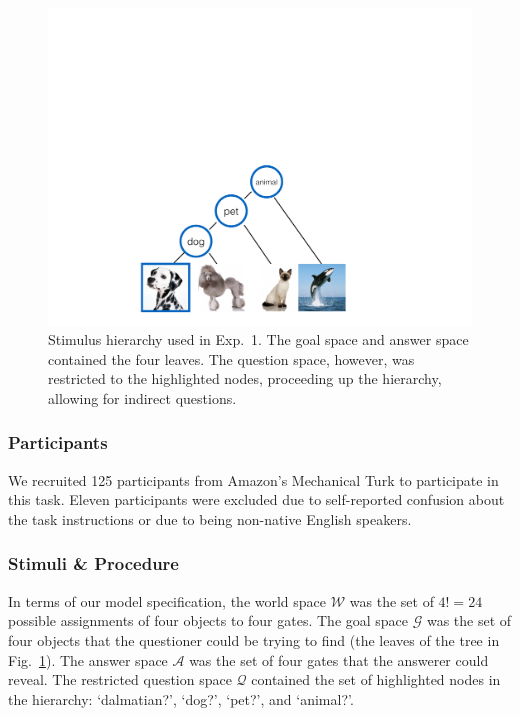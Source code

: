\documentclass[12pt, floatsintext, man]{apa6}
\begin{document}
\begin{figure}[t!]
\begin{center}
\includegraphics[scale = .35]{taskhierarchy.pdf}
\end{center}
\vspace{-.25cm}
\caption{Stimulus hierarchy used in Exp.~1. The goal space and answer space contained the four leaves. %
The question space, however, was restricted to the highlighted nodes, proceeding up the hierarchy, allowing for indirect questions.}
\label{fig:taskhierarchy}
\end{figure}

\subsubsection{Participants} We recruited 125 participants %
from Amazon's Mechanical Turk to participate in this task.  %
Eleven participants were excluded due to self-reported confusion about the task instructions or due to being non-native English speakers.

\subsubsection{Stimuli \& Procedure} In terms of our model specification, the world space $\mathcal{W}$ was the set of $4! = 24$ possible assignments of four objects to four gates. The goal space $\mathcal{G}$ was the set of four objects that the questioner could be trying to find (the leaves of the tree in Fig.~\ref{fig:taskhierarchy}). The answer space $\mathcal{A}$ was the set of four gates that the answerer could  reveal. The restricted question space $\mathcal{Q}$ contained the set of highlighted nodes in the hierarchy: `dalmatian?', `dog?', `pet?', and `animal?'. 
\end{document}
